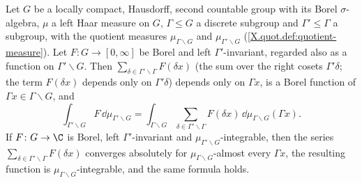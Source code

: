 Let $G$ be a locally compact, Hausdorff, second countable group with its Borel $\sigma$-algebra, $\mu$ a left Haar measure on
$G$, $\Gamma\le G$ a discrete subgroup and $\Gamma'\le\Gamma$ a subgroup, with the quotient measures $\mu_{\Gamma\backslash G}$ and
$\mu_{\Gamma'\backslash G}$ (\cref{X.quot.def:quotient-measure}). Let $F\colon G\to[0,\infty]$ be Borel and left $\Gamma'$-invariant, regarded
also as a function on $\Gamma'\backslash G$. Then $\sum_{\delta\in\Gamma'\backslash\Gamma}F(\delta x)$ (the sum over the right cosets $\Gamma'\delta$; the
term $F(\delta x)$ depends only on $\Gamma'\delta$) depends only on $\Gamma x$, is a Borel function of $\Gamma x\in\Gamma\backslash G$, and
\[
  \int_{\Gamma'\backslash G}F\,\dd\mu_{\Gamma'\backslash G}=\int_{\Gamma\backslash G}\sum_{\delta\in\Gamma'\backslash\Gamma}F(\delta x)\,\dd\mu_{\Gamma\backslash G}(\Gamma x).
\]
If $F\colon G\to\C$ is Borel, left $\Gamma'$-invariant and $\mu_{\Gamma'\backslash G}$-integrable, then the series
$\sum_{\delta\in\Gamma'\backslash\Gamma}F(\delta x)$ converges absolutely for $\mu_{\Gamma\backslash G}$-almost every $\Gamma x$, the resulting function
is $\mu_{\Gamma\backslash G}$-integrable, and the same formula holds.
